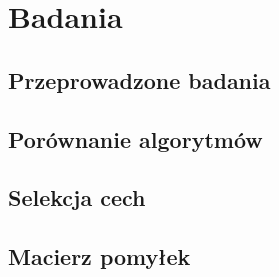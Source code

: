 \chapter{Badania}

\section{Przeprowadzone badania}

\section{Porównanie algorytmów}

\section{Selekcja cech}

\section{Macierz pomyłek}
